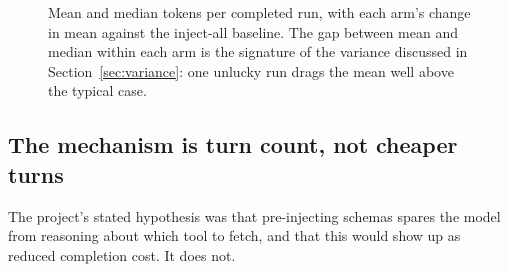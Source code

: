 \documentclass[11pt,a4paper]{article}
\newcommand{\gain}[1]{\textcolor{gaingreen}{\textbf{$-$#1\%}}}
\newcommand{\basetag}{\textcolor{gray}{baseline}}
\begin{document}
\begin{figure}[h]
\centering
{}
\caption{Mean and median tokens per completed run, with each arm's change in mean against the
inject-all baseline. The gap between mean and median within each arm is the signature of the
variance discussed in Section~\ref{sec:variance}: one unlucky run drags the mean well above the
typical case.}
\label{fig:headline}
\end{figure}

\subsection{The mechanism is turn count, not cheaper turns}

The project's stated hypothesis was that pre-injecting schemas spares the model from reasoning about
which tool to fetch, and that this would show up as reduced completion cost. It does not.
\end{document}
